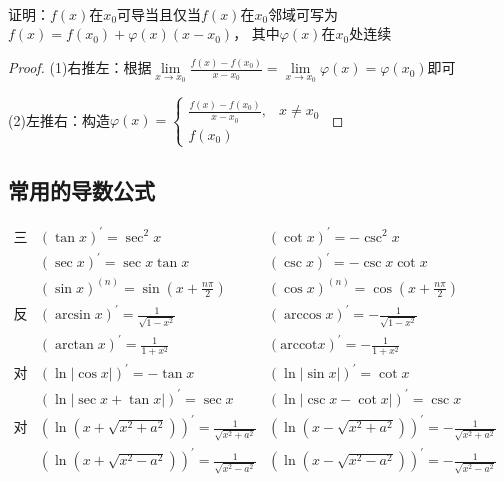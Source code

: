 ~

\begin{exercise}[可导性与可微性]
  证明：$f(x)$在$x_0$可导当且仅当$f(x)$在$x_0$邻域可写为$f(x) = f(x_0) + \varphi(x) (x - x_0)$，
  其中$\varphi(x)$在$x_0$处连续
\end{exercise}

\begin{proof}
  (1)右推左：根据$\lim \limits _{x \rightarrow x_0} \frac{f(x) - f(x_0)}{x - x_0} = \lim \limits _{x \rightarrow x_0} \varphi (x) = \varphi(x_0)$即可

  (2)左推右：构造$\varphi(x) =
  \begin{cases}
    \frac{f(x) - f(x_0)}{x - x_0}, & x \neq x_0\\
    f(x_0)
  \end{cases}
  $
\end{proof}


\subsection{常用的导数公式}

\begin{equation*}
  \begin{array}{lllll}
  \text{三角} &  (\tan x)^{\prime} = \sec^2 x & (\cot x)^{\prime} = - \csc^2 x & & \\
                                  & (\sec x)^{\prime} = \sec x \tan x&  (\csc x)^{\prime} = - \csc x \cot x & & \\ 
              &(\sin x)^{(n)} = \sin \left( x + \frac{n\pi}{2} \right)&(\cos x)^{(n)} = \cos \left( x + \frac{n\pi}{2} \right)&&\\
   \text{反三角} & 
                     (\arcsin x)^{\prime} = \frac{1}{\sqrt{1 - x^2}}&
                     (\arccos x)^{\prime} = - \frac{1}{\sqrt{1 - x^2}}& & \\
                    & (\arctan x)^{\prime} = \frac{1}{1 + x^2}&
                                                                (\text{arccot} x)^{\prime} = - \frac{1}{1+x^2} & & \\
   \text{对数三角}&
(\ln |\cos x|)^{\prime} = -\tan x&
                      (\ln |\sin x|)^{\prime} = \cot x& & \\
&                      (\ln |\sec x + \tan x|)^{\prime}  = \sec x&
                                                                  (\ln |\csc x - \cot x|)^{\prime} = \csc x & & \\
    \text{对数根式} &
(\ln (x + \sqrt{x^2 + a^2}))^{\prime} = \frac{1}{\sqrt{x^2 + a^2}}&
    (\ln ( x- \sqrt{x^2 + a^2}))^{\prime} = - \frac{1}{\sqrt{x^2 + a^2}}& & \\
&    (\ln (x + \sqrt{x^2 - a^2}))^{\prime} = \frac{1}{\sqrt{x^2 - a^2}}& 
    (\ln (x - \sqrt{x^2 - a^2}))^{\prime} = - \frac{1}{\sqrt{x^2 - a^2}} & & 
  \end{array}
\end{equation*}



